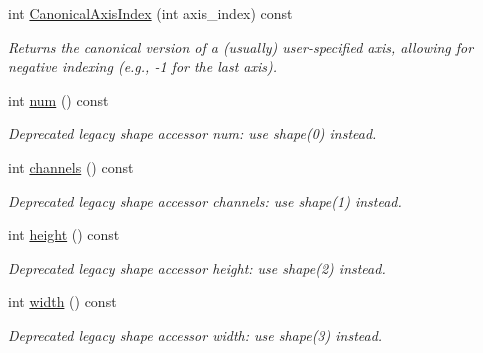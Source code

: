 \begin{DoxyCompactItemize}
int \mbox{\hyperlink{classcaffe_1_1_blob_ad686f5ed9994046f2c741bfa81118509}{Canonical\+Axis\+Index}} (int axis\+\_\+index) const
\begin{DoxyCompactList}\small\item\em Returns the \textquotesingle{}canonical\textquotesingle{} version of a (usually) user-\/specified axis, allowing for negative indexing (e.\+g., -\/1 for the last axis). \end{DoxyCompactList}\item 
\mbox{\label{classcaffe_1_1_blob_a80ed3eddf98ffd408e9a627b1a7c2a9e}} 
int \mbox{\hyperlink{classcaffe_1_1_blob_a80ed3eddf98ffd408e9a627b1a7c2a9e}{num}} () const
\begin{DoxyCompactList}\small\item\em Deprecated legacy shape accessor num\+: use shape(0) instead. \end{DoxyCompactList}\item 
\mbox{\label{classcaffe_1_1_blob_ae48c8e9f0a0b66b041e47bf37ed04471}} 
int \mbox{\hyperlink{classcaffe_1_1_blob_ae48c8e9f0a0b66b041e47bf37ed04471}{channels}} () const
\begin{DoxyCompactList}\small\item\em Deprecated legacy shape accessor channels\+: use shape(1) instead. \end{DoxyCompactList}\item 
\mbox{\label{classcaffe_1_1_blob_a18af535af43f4e9f85bd1e520886276f}} 
int \mbox{\hyperlink{classcaffe_1_1_blob_a18af535af43f4e9f85bd1e520886276f}{height}} () const
\begin{DoxyCompactList}\small\item\em Deprecated legacy shape accessor height\+: use shape(2) instead. \end{DoxyCompactList}\item 
\mbox{\label{classcaffe_1_1_blob_afbdc067c69e6b9bd6880a73c13db2ec6}} 
int \mbox{\hyperlink{classcaffe_1_1_blob_afbdc067c69e6b9bd6880a73c13db2ec6}{width}} () const
\begin{DoxyCompactList}\small\item\em Deprecated legacy shape accessor width\+: use shape(3) instead. \end{DoxyCompactList}\item 

\end{DoxyCompactItemize}
